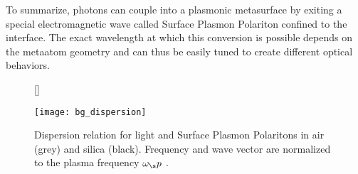 \indent
To summarize, photons can couple into a plasmonic metasurface by exiting a special electromagnetic wave called Surface Plasmon Polariton confined to the interface. The exact wavelength at which this conversion is possible depends on the metaatom geometry and can thus be easily tuned to create different optical behaviors.

\begin{figure}[H]
    [\FBwidth]
    {\caption{
        Dispersion relation for light and Surface Plasmon Polaritons in air (grey) and silica (black). Frequency and wave vector are normalized to the plasma frequency $\omega_\s p$ \cite{Maier2007}.
    }
    \label{fig:bg:dispersion}}
    {\texttt{[image: bg\_dispersion]}}
\end{figure}